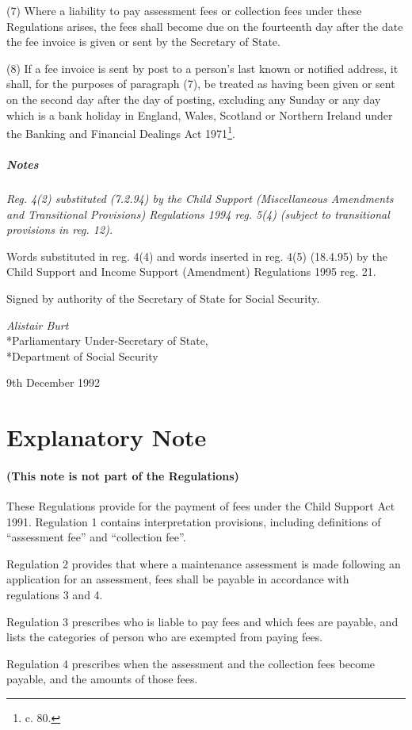 \documentclass[a4paper]{article}
\newcommand{\parthead}{}
\newcommand\amendment[1]{\subsubsection*{Notes}{\itshape\frenchspacing\footnotesize #1 \par}}
\begin{document}
(7) Where a liability to pay assessment fees or collection fees under these Regulations arises, the fees shall become due on the fourteenth day after the date the fee invoice is given or sent by the Secretary of State.

(8) If a fee invoice is sent by post to a person’s last known or notified address, it shall, for the purposes of paragraph (7), be treated as having been given or sent on the second day after the day of posting, excluding any Sunday or any day which is a bank holiday in England, Wales, Scotland or Northern Ireland under the Banking and Financial Dealings Act 1971\footnote{ c. 80.}.

\amendment{
Reg. 4(2) substituted (7.2.94) by the Child Support (Miscellaneous Amendments and Transitional Provisions) Regulations 1994 reg. 5(4) (subject to transitional provisions in reg. 12).

Words substituted in reg. 4(4) and words inserted in reg. 4(5) (18.4.95) by the Child Support and Income Support (Amendment) Regulations 1995 reg. 21.
}

\bigskip

Signed by authority of the Secretary of State for Social Security.

{\raggedleft
\emph{Alistair Burt}\\*Parliamentary Under-Secretary of State,\\*Department of Social Security

}

9th December 1992

\part{Explanatory Note}

\renewcommand\parthead{--- Explanatory Note}

\subsection*{(This note is not part of the Regulations)}

 These Regulations provide for the payment of fees under the Child Support Act 1991. Regulation 1 contains interpretation provisions, including definitions of “assessment fee” and “collection fee”.

  Regulation 2 provides that where a maintenance assessment is made following an application for an assessment, fees shall be payable in accordance with regulations 3 and 4.

  Regulation 3 prescribes who is liable to pay fees and which fees are payable, and lists the categories of person who are exempted from paying fees.

  Regulation 4 prescribes when the assessment and the collection fees become payable, and the amounts of those fees.
\end{document}

